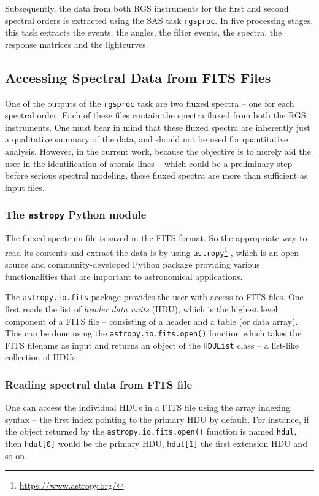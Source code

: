                 Subsequently, the data from both RGS instruments for the first and second spectral orders is extracted using the SAS task \texttt{rgsproc}. In five processing stages, this task extracts the events, the angles, the filter events, the spectra, the response matrices and the lightcurves.
        
        \subsection{Accessing Spectral Data from FITS Files} \label{tool:rgs-files:access}
            One of the outputs of the \texttt{rgsproc} task are two fluxed spectra -- one for each spectral order. Each of these files contain the spectra fluxed from both the RGS instruments. One must bear in mind that these fluxed spectra are inherently just a qualitative summary of the data, and should not be used for quantitative analysis. However, in the current work, because the objective is to merely aid the user in the identification of atomic lines -- which could be a preliminary step before serious spectral modeling, these fluxed spectra are more than sufficient as input files.
            
            \subsubsection{The \texttt{astropy} Python module} \label{tool:rgs-files:access:astropy}
                The fluxed spectrum file is saved in the FITS format. So the appropriate way to read its contents and extract the data is by using \texttt{astropy}\footnote{\url{https://www.astropy.org/}} \cite{robitaille2013astropy}, which is an open-source and community-developed Python package providing various functionalities that are important to astronomical applications.
                
                The \texttt{astropy.io.fits} package provides the user with access to FITS files. One first reads the list of \textit{header data units} (HDU), which is the highest level component of a FITS file -- consisting of a header and a table (or data array). This can be done using the \texttt{astropy.io.fits.open()} function which takes the FITS filename as input and returns an object of the \texttt{HDUList} class -- a list-like collection of HDUs.
            
            \subsubsection{Reading spectral data from FITS file} \label{tool:rgs-files:access:io}
                One can access the individual HDUs in a FITS file using the array indexing syntax -- the first index pointing to the primary HDU by default. For instance, if the object returned by the \texttt{astropy.io.fits.open()} function is named \texttt{hdul}, then \texttt{hdul[0]} would be the primary HDU, \texttt{hdul[1]} the first extension HDU and so on.
                
